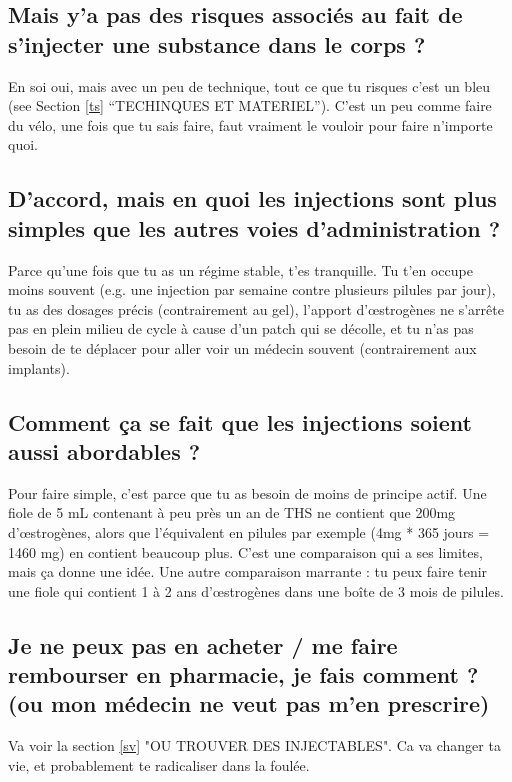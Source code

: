 \documentclass{article}
\begin{document}
\subsection{Mais y'a pas des risques associés au fait de s'injecter une substance dans le corps ?}

En soi oui, mais avec un peu de technique, tout ce que tu risques c'est un bleu (see Section \ref{ts} “TECHINQUES ET MATERIEL”). C'est un peu comme faire du vélo, une fois que tu sais faire, faut vraiment le vouloir pour faire n'importe quoi.

\subsection{D'accord, mais en quoi les injections sont plus simples que les autres voies d'administration ?}

Parce qu'une fois que tu as un régime stable, t'es tranquille. Tu t'en occupe moins souvent (e.g. une injection par semaine contre plusieurs pilules par jour), tu as des dosages précis (contrairement au gel), l'apport d'œstrogènes ne s'arrête pas en plein milieu de cycle à cause d'un patch qui se décolle, et tu n'as pas besoin de te déplacer pour aller voir un médecin souvent (contrairement aux implants).

\subsection{Comment ça se fait que les injections soient aussi abordables ?}

Pour faire simple, c'est parce que tu as besoin de moins de principe actif. Une fiole de 5 mL contenant à peu près un an de THS ne contient que 200mg d'œstrogènes, alors que l'équivalent en pilules par exemple (4mg * 365 jours = 1460 mg) en contient beaucoup plus. C'est une comparaison qui a ses limites, mais ça donne une idée. Une autre comparaison marrante : tu peux faire tenir une fiole qui contient 1 à 2 ans d'œstrogènes dans une boîte de 3 mois de pilules. 

\subsection{Je ne peux pas en acheter / me faire rembourser en pharmacie, je fais comment ? (ou mon médecin ne veut pas m'en prescrire)}

Va voir la section \ref{sv} "OU TROUVER DES INJECTABLES". Ca va changer ta vie, et probablement te radicaliser dans la foulée.
\end{document}
